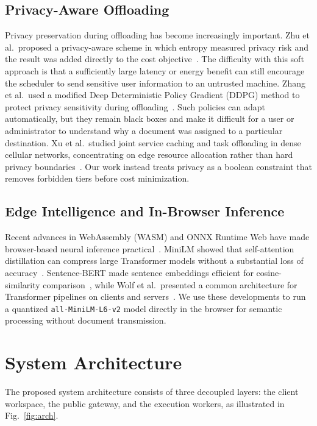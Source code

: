 \documentclass[conference]{IEEEtran}
\begin{document}
\subsection{Privacy-Aware Offloading}
Privacy preservation during offloading has become increasingly important.
Zhu et al.\ proposed a privacy-aware scheme in which entropy measured privacy risk and the result was added directly to the cost objective~\cite{zhu2021}.
The difficulty with this soft approach is that a sufficiently large latency or energy benefit can still encourage the scheduler to send sensitive user information to an untrusted machine.
Zhang et al.\ used a modified Deep Deterministic Policy Gradient (DDPG) method to protect privacy sensitivity during offloading~\cite{gao2024}.
Such policies can adapt automatically, but they remain black boxes and make it difficult for a user or administrator to understand why a document was assigned to a particular destination.
Xu et al.\ studied joint service caching and task offloading in dense cellular networks, concentrating on edge resource allocation rather than hard privacy boundaries~\cite{xu2023}.
Our work instead treats privacy as a boolean constraint that removes forbidden tiers before cost minimization.

\subsection{Edge Intelligence and In-Browser Inference}
Recent advances in WebAssembly (WASM) and ONNX Runtime Web have made browser-based neural inference practical~\cite{onnxweb}.
MiniLM showed that self-attention distillation can compress large Transformer models without a substantial loss of accuracy~\cite{wang2020miniLM}.
Sentence-BERT made sentence embeddings efficient for cosine-similarity comparison~\cite{reimers2019}, while Wolf et al.\ presented a common architecture for Transformer pipelines on clients and servers~\cite{wolf2020}.
We use these developments to run a quantized \texttt{all-MiniLM-L6-v2} model directly in the browser for semantic processing without document transmission.

\section{System Architecture}

The proposed system architecture consists of three decoupled layers: the client workspace, the public gateway, and the execution workers, as illustrated in Fig.~\ref{fig:arch}.
\end{document}

